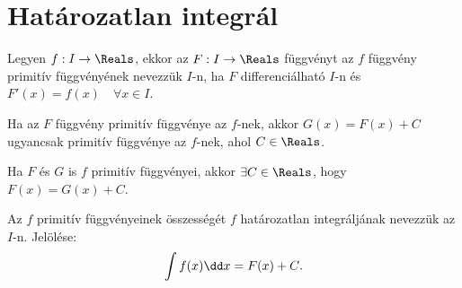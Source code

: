 \section{Határozatlan integrál}\label{section.7.1}

\vfill

\begin{definition}
  Legyen $f: I \rightarrow \Reals$, ekkor az $F : I \rightarrow \Reals$
  függvényt az $f$ függvény primitív függvényének nevezzük $I$-n, ha $F$
  differenciálható $I$-n és $F'(x) = f(x) \quad \forall x \in I$.
\end{definition}

\vfill

\begin{note}
  Ha az $F$ függvény primitív függvénye az $f$-nek, akkor $G(x) = F(x) + C$
  ugyancsak primitív függvénye az $f$-nek, ahol $C \in \Reals$.
\end{note}

\vfill

\begin{note}
  Ha $F$ és $G$ is $f$ primitív függvényei, akkor $\exists C \in \Reals$, hogy
  $F(x) = G(x) + C$.
\end{note}

\vfill

\begin{definition}
  Az $f$ primitív függvényeinek összességét $f$ határozatlan integráljának
  nevezzük az $I$-n. Jelölése:
  \[
    \int f(x) \dd x = F(x) + C
    \text.
  \]
\end{definition}

\vfill

